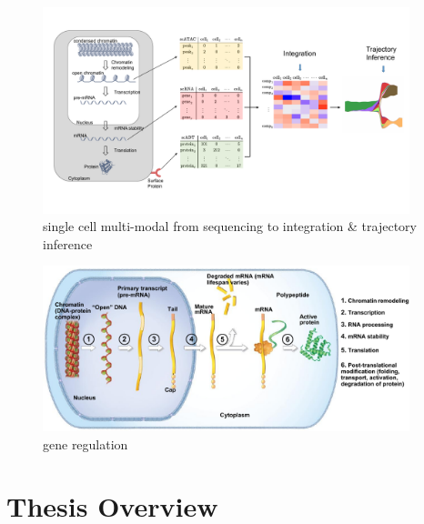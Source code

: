 \begin{figure}[!ht]
	\centering
	\includegraphics[width=0.95\textwidth]{multimodal_schematic/fig}
	\vspace{0.1cm}
	\caption[single cell multi-modal from sequencing to integration \& trajectory inference]{single cell multi-modal from sequencing to integration \& trajectory inference}
	\label{fig:sc_mulitmodal_sequencing_to_integration_ti}
\end{figure}



\begin{figure}[!ht]
	\centering
	\includegraphics[width=0.95\textwidth]{gene_expression_process/fig}
	\vspace{0.1cm}
	\caption[gene regulation]{gene regulation}
	\label{fig:gene_expression_process}
\end{figure}

\section{Thesis Overview}
\label{introduction:sec2.overview}

